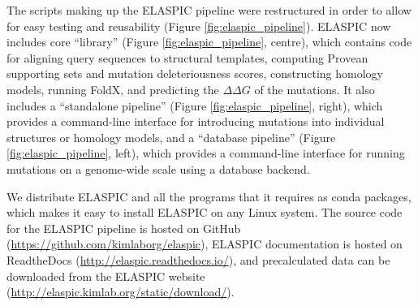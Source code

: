 The scripts making up the ELASPIC pipeline were restructured in order to allow for easy testing and reusability (Figure \ref{fig:elaspic_pipeline}). ELASPIC now includes core ``library'' (Figure \ref{fig:elaspic_pipeline}, centre), which contains code for aligning query sequences to structural templates, computing Provean supporting sets and mutation deleteriousness scores, constructing homology models, running FoldX, and predicting the $\Delta \Delta G$ of the mutations. It also includes a ``standalone pipeline'' (Figure \ref{fig:elaspic_pipeline}, right), which provides a command-line interface for introducing mutations into individual structures or homology models, and a ``database pipeline'' (Figure \ref{fig:elaspic_pipeline}, left), which provides a command-line interface for running mutations on a genome-wide scale using a database backend.

We distribute ELASPIC and all the programs that it requires as conda packages, which makes it easy to install ELASPIC on any Linux system. The source code for the ELASPIC pipeline is hosted on GitHub (\url{https://github.com/kimlaborg/elaspic}), ELASPIC documentation is hosted on ReadtheDocs (\url{http://elaspic.readthedocs.io/}), and precalculated data can be downloaded from the ELASPIC website (\url{http://elaspic.kimlab.org/static/download/}).


